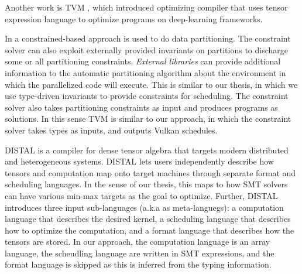 \documentclass[10pt,a4paper]{article}
\begin{document}
Another work is TVM \cite{TvmAnAChen2018}, which introduced optimizing compiler that uses tensor expression language to optimize programs on deep-learning frameworks.

In \cite{AConstraintBaLeeW2019} a constrained-based approach is used to do data partitioning.
The constraint solver can also exploit externally provided invariants on partitions to discharge some or all partitioning constraints.
\emph{External libraries} can provide additional information to the automatic partitioning algorithm about the environment in which the parallelized code will execute.
This is similar to our thesis, in which we use type-driven invariants to provide constraints for scheduling.
The constraint solver also takes partitioning constraints as input and produces programs as solutions.
In this sense TVM is similar to our approach, in which the constraint solver takes types as inputs, and outputs Vulkan schedules.

DISTAL \cite{DistalTheDisYadav2022} is a compiler for dense tensor algebra that targets modern distributed and heterogeneous systems.
DISTAL lets users independently describe how tensors and computation map onto target machines through separate format and scheduling languages.
In the sense of our thesis, this maps to how SMT solvers can have various min-max targets as the goal to optimize.
Further, DISTAL introduces three input sub-languages (a.k.a as meta-languegs): a computation language that describes the desired kernel, a scheduling language that describes how to optimize the computation, and a format language that describes how the tensors are stored.
In our approach, the computation language is an array language, the scheudling language are written in SMT expressions, and the format language is skipped as this is inferred from the typing information.
\end{document}
